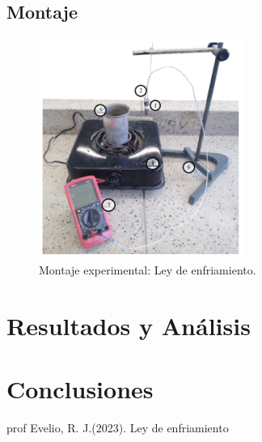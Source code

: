 \documentclass[10pt]{article}
\begin{document}
\subsection{Montaje}
\begin{figure}
    \centering
    \includegraphics{Montaje.png}
    \caption{Montaje experimental: Ley de enfriamiento.}
    
\end{figure}
\section{Resultados y Análisis}


\section{Conclusiones}


\begin{thebibliography}{15}
   {prof} Evelio, R. J.(2023). Ley de enfriamiento
\end{thebibliography}
\end{document}
